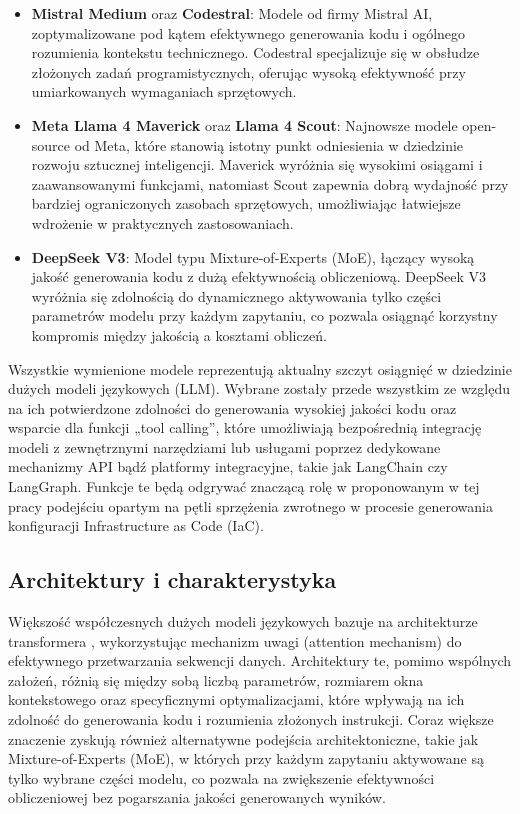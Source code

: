 \begin{itemize}
    \item \textbf{Mistral Medium} oraz \textbf{Codestral}: Modele od firmy Mistral AI, zoptymalizowane pod kątem efektywnego generowania kodu i ogólnego rozumienia kontekstu technicznego. Codestral specjalizuje się w obsłudze złożonych zadań programistycznych, oferując wysoką efektywność przy umiarkowanych wymaganiach sprzętowych.
    \item \textbf{Meta Llama 4 Maverick} oraz \textbf{Llama 4 Scout}: Najnowsze modele open-source od Meta, które stanowią istotny punkt odniesienia w dziedzinie rozwoju sztucznej inteligencji. Maverick wyróżnia się wysokimi osiągami i zaawansowanymi funkcjami, natomiast Scout zapewnia dobrą wydajność przy bardziej ograniczonych zasobach sprzętowych, umożliwiając łatwiejsze wdrożenie w praktycznych zastosowaniach.
    \item \textbf{DeepSeek V3}: Model typu Mixture-of-Experts (MoE), łączący wysoką jakość generowania kodu z dużą efektywnością obliczeniową. DeepSeek V3 wyróżnia się zdolnością do dynamicznego aktywowania tylko części parametrów modelu przy każdym zapytaniu, co pozwala osiągnąć korzystny kompromis między jakością a kosztami obliczeń.
\end{itemize}

Wszystkie wymienione modele reprezentują aktualny szczyt osiągnięć w dziedzinie dużych modeli językowych (LLM). Wybrane zostały przede wszystkim ze względu na ich potwierdzone zdolności do generowania wysokiej jakości kodu oraz wsparcie dla funkcji „tool calling”, które umożliwiają bezpośrednią integrację modeli z zewnętrznymi narzędziami lub usługami poprzez dedykowane mechanizmy API bądź platformy integracyjne, takie jak LangChain czy LangGraph. Funkcje te będą odgrywać znaczącą rolę w proponowanym w tej pracy podejściu opartym na pętli sprzężenia zwrotnego w procesie generowania konfiguracji Infrastructure as Code (IaC).

\subsection{Architektury i charakterystyka}

Większość współczesnych dużych modeli językowych bazuje na architekturze transformera \cite{vaswani_attention_2023}, wykorzystując mechanizm uwagi (attention mechanism) do efektywnego przetwarzania sekwencji danych. Architektury te, pomimo wspólnych założeń, różnią się między sobą liczbą parametrów, rozmiarem okna kontekstowego oraz specyficznymi optymalizacjami, które wpływają na ich zdolność do generowania kodu i rozumienia złożonych instrukcji. Coraz większe znaczenie zyskują również alternatywne podejścia architektoniczne, takie jak Mixture-of-Experts (MoE), w których przy każdym zapytaniu aktywowane są tylko wybrane części modelu, co pozwala na zwiększenie efektywności obliczeniowej bez pogarszania jakości generowanych wyników.

